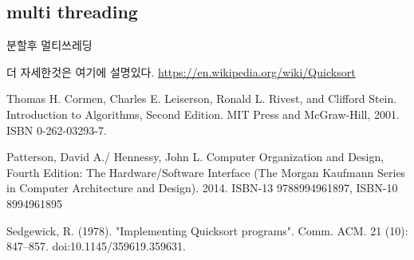 \documentclass{oblivoir}
\begin{document}
\subsection{multi threading}
분할후 멀티쓰레딩

더 자세한것은 여기에 설명있다. \url{https://en.wikipedia.org/wiki/Quicksort}

\newpage

\begin{thebibliography}{}
    Thomas H. Cormen, Charles E. Leiserson, Ronald L. Rivest, and Clifford Stein. Introduction to Algorithms, Second Edition. MIT Press and McGraw-Hill, 2001. ISBN 0-262-03293-7.
    
    Patterson, David A./ Hennessy, John L. Computer Organization and Design, Fourth Edition: The Hardware/Software Interface (The Morgan Kaufmann Series in Computer Architecture and Design). 2014. ISBN-13 9788994961897, ISBN-10 8994961895

    Sedgewick, R. (1978). "Implementing Quicksort programs". Comm. ACM. 21 (10): 847–857. doi:10.1145/359619.359631.

\end{thebibliography}
\end{document}
